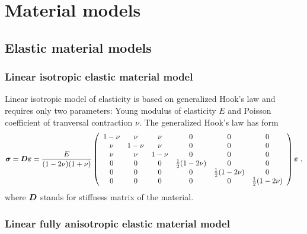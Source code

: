 \chapter{Material models}
\label{sectmatmodels}

\section{Elastic material models}

\subsection{Linear isotropic elastic material model}
\label{sectelastmatmodel}

Linear isotropic model of elasticity is based on generalized Hook's  law
and requires only two parameters: Young modulus 
of elasticity $E$ and Poisson coefficient  of tranversal contraction $\nu$.
The generalized Hook's law has form
\begin{equation}
\mbox{\boldmath$\sigma$} = \mbox{\boldmath$D$} \mbox{\boldmath$\varepsilon$} =
\mbox{$\displaystyle\frac{E}{(1-2\nu)(1+\nu)}$}
\left(\begin{array}{cccccc}
1-\nu & \nu & \nu & 0 & 0 & 0
\\
\nu & 1-\nu & \nu & 0 & 0 & 0
\\
\nu & \nu & 1-\nu & 0 & 0 & 0
\\
0 & 0 & 0 & {1\over2}(1-2\nu) & 0 & 0
\\
0 & 0 & 0 & 0 & {1\over2}(1-2\nu) & 0
\\
0 & 0 & 0 & 0 & 0 & {1\over2}(1-2\nu)
\end{array}\right)
\mbox{\boldmath$\varepsilon$}\ ,
\end{equation}
where $\mbox{\boldmath$D$}$ stands for stiffness matrix of the material.

\subsection{Linear fully anisotropic elastic material model}
\label{sectelasanimodel}

